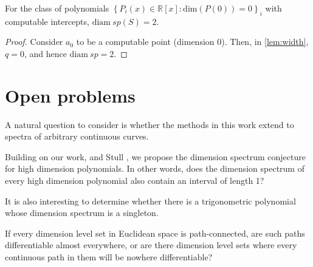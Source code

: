 \documentclass[a4paper,UKenglish,cleveref,autoref,thm-restate]{lipics-v2021}
\newcommand{\diam}{\mathrm{diam}}
\renewcommand{\dim}{{\mathrm{dim}}}
\begin{document}
\begin{corollary}
  For the class of polynomials
  $\left\{P_i(x)\in\mathbb{R}[x]:\dim(P(0))=0\right\}_i$ with
  computable intercepts, $\diam\ sp(S)=2$.
\end{corollary}
\begin{proof}
  Consider $a_0$ to be a computable point (dimension 0). Then, in
  \cref{lem:width}, $q=0$, and hence $\diam\ sp=2$.
\end{proof}













\section{Open problems}

A natural question to consider is whether the methods in this work extend to spectra of arbitrary continuous curves. 

Building on our work, and Stull \cite{Stull2025}, we propose the dimension spectrum conjecture for high dimension polynomials. In other words, does the dimension spectrum of every high dimension polynomial also contain an interval of length 1?  

It is also interesting to determine whether there is a trigonometric polynomial whose dimension spectrum is a singleton. 

If every dimension level set in Euclidean space is path-connected, are such paths differentiable almost everywhere, or are there dimension level sets where every continuous path in them will be nowhere differentiable? 





\end{document}
